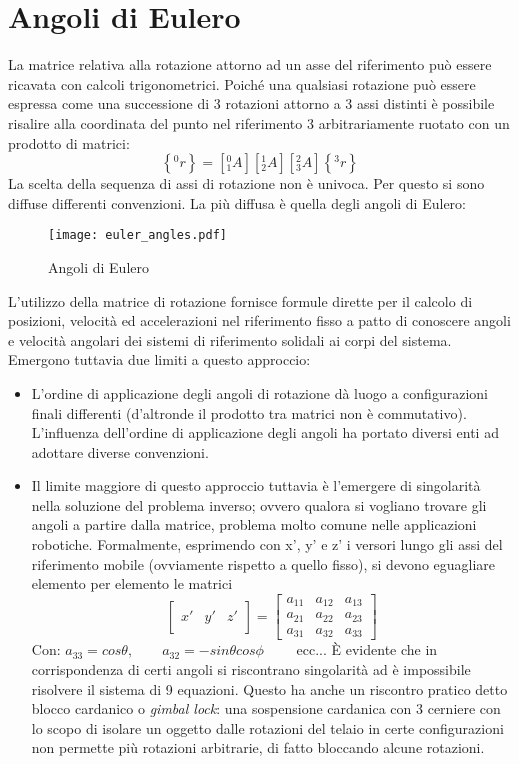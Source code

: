 \section{Angoli di Eulero}
La matrice relativa alla rotazione attorno ad un asse del riferimento può essere ricavata con calcoli trigonometrici. Poiché una qualsiasi rotazione può essere espressa come una successione di 3 rotazioni attorno a 3 assi distinti è possibile risalire alla coordinata del punto nel riferimento 3 arbitrariamente ruotato con un prodotto di matrici:
\begin{equation}
\label{eq:1.2}
\left\{^0r\right\} = \left[_1^0A\right]\left[_2^1A\right]\left[_3^2A\right]\left\{^3r\right\}
\end{equation}
La scelta della sequenza di assi di rotazione non è univoca. Per questo si sono diffuse differenti convenzioni. La più diffusa è quella degli angoli di Eulero:
\begin{figure}[h!]
\centering
\texttt{[image: euler\_angles.pdf]}
\caption{Angoli di Eulero}
\label{fig:1.2}
\end{figure}
L'utilizzo della matrice di rotazione fornisce formule dirette per il calcolo di posizioni, velocità ed accelerazioni nel riferimento fisso a patto di conoscere angoli e velocità angolari dei sistemi di riferimento solidali ai corpi del sistema. Emergono tuttavia due limiti a questo approccio: \begin{itemize}
\item L'ordine di applicazione degli angoli di rotazione dà luogo a configurazioni finali differenti (d'altronde il prodotto tra matrici non è commutativo). L'influenza dell'ordine di applicazione degli angoli ha portato diversi enti ad adottare diverse convenzioni.
\item Il limite maggiore di questo approccio tuttavia è l'emergere di singolarità nella soluzione del problema inverso; ovvero qualora si vogliano trovare gli angoli a partire dalla matrice, problema molto comune nelle applicazioni robotiche. Formalmente, esprimendo con x', y' e z' i versori lungo gli assi del riferimento mobile (ovviamente rispetto a quello fisso), si devono eguagliare elemento per elemento le matrici
\[ \begin{bmatrix}   \\ x'& y'&z' \\ \text{ } \end{bmatrix} = \begin{bmatrix}
a_{11} & a_{12} & a_{13} \\ a_{21} & a_{22} & a_{23} \\ a_{31} & a_{32} & a_{33}\end{bmatrix} \]
Con: \qquad $a_{33} = cos\theta,\qquad a_{32} = -sin\theta cos\phi \qquad$ ecc... \newline
È evidente che in corrispondenza di certi angoli si riscontrano singolarità ad è impossibile risolvere il sistema di 9 equazioni. Questo ha anche un riscontro pratico detto blocco cardanico o \textit{gimbal lock}: una sospensione cardanica con 3 cerniere con lo scopo di isolare un oggetto dalle rotazioni del telaio in certe configurazioni non permette più rotazioni arbitrarie, di fatto bloccando alcune rotazioni.  
\end{itemize}

